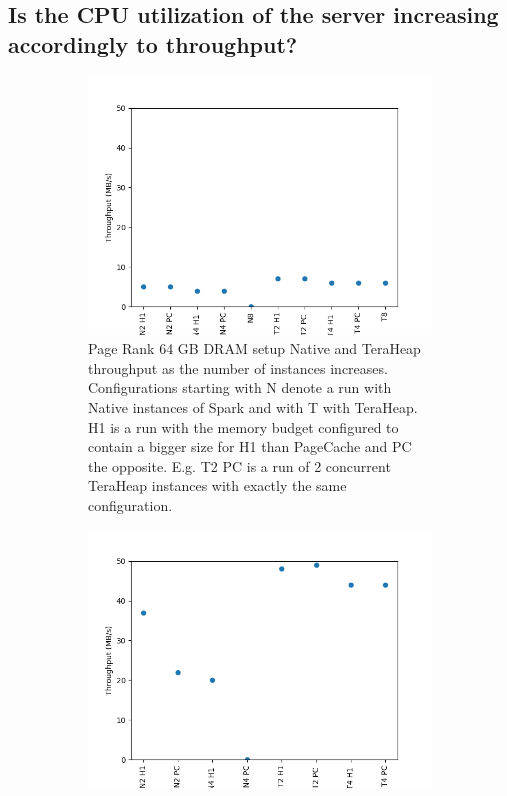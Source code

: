 \subsection{Is the CPU utilization of the server increasing
accordingly to throughput?}
\begin{figure}[htbp]
	\centering
	\begin{subfigure}[b]{0.48\textwidth}
        \includegraphics[width=\linewidth]{./fig/PR_64_THR.png}
    \caption{Page Rank 64 GB DRAM setup Native and TeraHeap throughput
    as the number of instances increases. Configurations starting with
    N denote a run with Native instances of Spark and with T with
    TeraHeap. H1 is a run with the memory budget configured to contain
    a bigger size for H1 than PageCache and PC the opposite. E.g. T2
    PC is a run of 2 concurrent TeraHeap instances with exactly the
    same configuration.}
	\label{fig:pr_64_thr}
\end{subfigure}
	\begin{subfigure}[b]{0.48\textwidth}
        \includegraphics[width=\linewidth]{./fig/LINR_64_THR.png}

\end{subfigure}
\end{figure}
